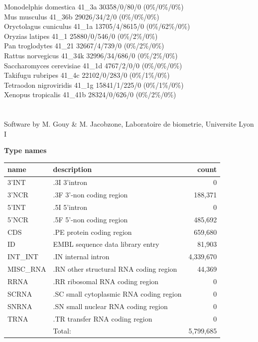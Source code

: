 \documentclass{article}
\begin{document}
\begin{Schunk}
Monodelphis domestica                   41\_3a 30358/0/80/0 (0\%/0\%/0\%)\\
Mus musculus                            41\_36b 29026/34/2/0 (0\%/0\%/0\%)\\
Oryctolagus cuniculus                   41\_1a 13705/4/8615/0 (0\%/62\%/0\%)\\
Oryzias latipes                         41\_1 25880/0/546/0 (0\%/2\%/0\%)\\
Pan troglodytes                         41\_21 32667/4/739/0 (0\%/2\%/0\%)\\
Rattus norvegicus                       41\_34k 32996/34/686/0 (0\%/2\%/0\%)\\
Saccharomyces cerevisiae                41\_1d 4767/2/0/0 (0\%/0\%/0\%)\\
Takifugu rubripes                       41\_4c 22102/0/283/0 (0\%/1\%/0\%)\\
Tetraodon nigroviridis                  41\_1g 15841/1/225/0 (0\%/1\%/0\%)\\
Xenopus tropicalis                      41\_41b 28324/0/626/0 (0\%/2\%/0\%)\\
\\
	     \\
Software by M. Gouy \& M. Jacobzone, Laboratoire de biometrie, Universite Lyon I 

\textbf{Type names}
\noindent\begin{tabular}{llr}
\hline \hline
name & description & count \\
\hline
3'INT  &  .3I 3'intron  &  0 \\
3'NCR  &  .3F  3'-non coding region  &  188,371 \\
5'INT  &  .5I 5'intron  &  0 \\
5'NCR  &  .5F  5'-non coding region  &  485,692 \\
CDS  &  .PE protein coding region  &  659,680 \\
ID  &  EMBL sequence data library entry  &  81,903 \\
INT\_INT  &  .IN  internal intron  &  4,339,670 \\
MISC\_RNA  &  .RN other structural RNA coding region  &  44,369 \\
RRNA  &  .RR ribosomal RNA coding region  &  0 \\
SCRNA  &  .SC small cytoplasmic RNA coding region  &  0 \\
SNRNA  &  .SN small nuclear RNA coding region  &  0 \\
TRNA  &  .TR transfer RNA coding region  &  0 \\
\hline
 & Total: & 5,799,685 \\
\hline \hline
\end{tabular}


\end{Schunk}
\end{document}
